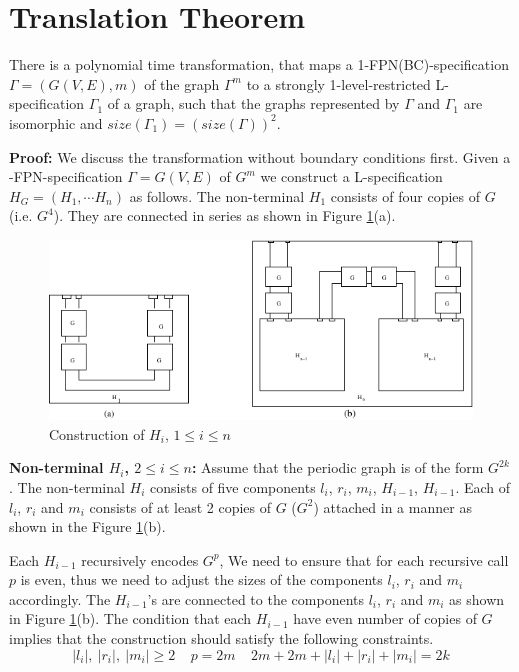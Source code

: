 \section{Translation Theorem}\label{sec:translation}


\begin{theorem}\label{th:translate}
There is a polynomial time transformation, that maps a 
1-FPN(BC)-specification $\Gamma = (G(V,E), m)$ of the  graph $\Gamma^m$ 
to a strongly 1-level-restricted 
L-specification $\Gamma_1$ of a graph, 
such that the graphs represented by 
$\Gamma$ and $\Gamma_1$ are isomorphic and 
$size(\Gamma_1) = (size(\Gamma))^2$.
\end{theorem}

\noindent
{\bf Proof:} We discuss the transformation without boundary conditions first.
Given a {-FPN}-specification  $\Gamma = G(V,E)$ of $G^m$ 
we construct a {\sf L}-specification $H_G = (H_1, \cdots H_n)$ as follows. 
The non-terminal $H_1$  consists of four copies of $G$ (i.e. $G^4$). 
They are connected in series as shown in Figure \ref{translation1.fig}(a). 

\begin{figure}[tbh]
\centering
\includegraphics{translation1}
\caption{Construction of $H_i$, $1 \leq i \leq n$}
\label{translation1.fig}
\end{figure}




\noindent 
{\bf Non-terminal  $H_i$, $2 \leq i \leq n$:}
Assume that the periodic graph is of the form $G^{2k}$.
The non-terminal $H_i$ consists of five components
$l_i$, $r_i$, $m_i$, $H_{i-1}$, $H_{i-1}$. 
Each of $l_i$, $r_i$ and  $m_i$ consists of at least 2 copies of $G$ 
($G^2$) attached in a manner as shown in the Figure \ref{translation1.fig}(b). 

Each $H_{i-1}$ recursively encodes $G^{p}$, 
We need to ensure that for each recursive
call $p$ is even, thus we need to adjust the sizes of 
the components $l_i$, $r_i$ and  $m_i$ accordingly.
The $H_{i-1}$'s 
are connected to the components $l_i$, $r_i$ and  $m_i$ as shown in 
Figure \ref{translation1.fig}(b). 
The condition that each $H_{i-1}$ have even number of copies of $G$ 
implies that the construction should satisfy the following constraints.
\[ |l_i|, ~ |r_i|, ~  |m_i| \geq 2   
~~~~~ p = 2m  
~~~~~ 2m + 2m + |l_i| + |r_i| +  |m_i| = 2k \]  


